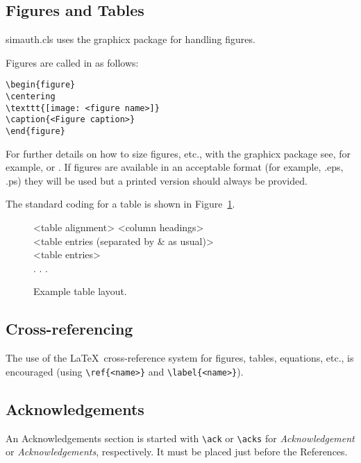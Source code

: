 \documentclass[times]{simauth}
\begin{document}
\subsection{Figures and Tables} \textsf{simauth.cls} uses the
\textsf{graphicx} package for handling figures.

Figures are called in as follows:
\begin{verbatim}
\begin{figure}
\centering
\texttt{[image: <figure name>]}
\caption{<Figure caption>}
\end{figure}
\end{verbatim}

For further details on how to size figures, etc., with the
\textsf{graphicx} package see, for example, \cite{R1}
or \cite{R3}. If figures are available in an
acceptable format (for example, .eps, .ps) they will be used but a
printed version should always be provided. \medbreak

The standard coding for a table is shown in Figure~\ref{F2}.

\begin{figure}
\setlength{\fboxsep}{0pt}%
\setlength{\fboxrule}{0pt}%
\begin{center}
\begin{boxedverbatim}
\begin{table}
\caption{<Table caption>}
\centering
\begin{tabular}{<table alignment>}
\toprule
<column headings>\\
\midrule
<table entries
(separated by & as usual)>\\
<table entries>\\
.
.
.\\
\bottomrule
\end{tabular}
\end{table}
\end{boxedverbatim}
\end{center}
\caption{Example table layout.\label{F2}}
\end{figure}

\subsection{Cross-referencing}
The use of the \LaTeX\ cross-reference system
for figures, tables, equations, etc., is encouraged
(using \verb"\ref{<name>}" and \verb"\label{<name>}").

\subsection{Acknowledgements} An Acknowledgements section is started with \verb"\ack" or
\verb"\acks" for \textit{Acknowledgement} or
\textit{Acknowledgements}, respectively. It must be placed just
before the References.
\end{document}
